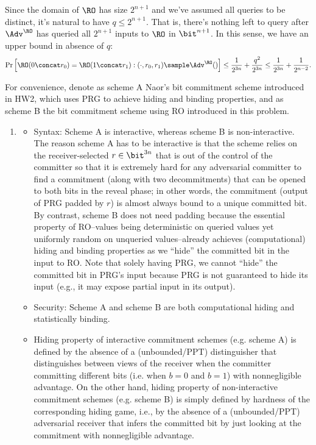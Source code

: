 \begin{answer}[ii]
    \begin{remark}
        Since the domain of $\RO$ has size $2^{n+1}$ and we've assumed all queries to be distinct, it's natural to have $q\le 2^{n+1}$. That is, there's nothing left to query after $\Adv^\RO$ has queried all $2^{n+1}$ inputs to $\RO$ in $\bit^{n+1}$.
        In this sense, we have an upper bound in absence of $q$:
        \[
            \Pr\left[\RO(0\concat r_0)=\RO(1\concat r_1) : (\cdot, r_0, r_1)\sample \Adv^\RO() \right]\le \frac{1}{2^{3n}}+ \frac{q^2}{2^{3n}}
            \le \frac{1}{2^{3n}}+ \frac{1}{2^{n-2}}.
        \]
    \end{remark}
\end{answer}






\begin{answer}[iii]
    \leavevmode\par
    For convenience, denote as scheme A Naor's bit commitment scheme introduced in HW2, which uses PRG to achieve hiding and binding properties, and as scheme B the bit commitment scheme using RO introduced in this problem. 
    \begin{enumerate}
        \item[(a)]
        \begin{itemize}
            \item Syntax: Scheme A is interactive, whereas scheme B is non-interactive. The reason scheme A has to be interactive is that the scheme relies on the receiver-selected $r\in\bit^{3n}$ that is out of the control of the committer so that it is extremely hard for any adversarial committer to find a commitment (along with two decommitments) that can be opened to both bits in the reveal phase; in other words, the commitment (output of PRG padded by $r$) is almost always bound to a unique committed bit. By contrast, scheme B does not need padding because the essential property of RO--values being deterministic on queried values yet uniformly random on unqueried values--already achieves (computational) hiding and binding properties as we ``hide'' the committed bit in the input to RO. Note that solely having PRG, we cannot ``hide'' the committed bit in PRG's input because PRG is not guaranteed to hide its input (e.g., it may expose partial input in its output).
            \item Security: Scheme A and scheme B are both computational hiding and statistically binding.
            \item Hiding property of interactive commitment schemes (e.g. scheme A) is defined by the absence of a (unbounded/PPT) distinguisher that distinguishes between views of the receiver when the committer committing different bits (i.e. when $b=0$ and $b=1$) with nonnegligible advantage.  On the other hand, hiding property of non-interactive  commitment schemes  (e.g. scheme B) is simply defined by hardness of the corresponding hiding game, i.e., by the absence of a (unbounded/PPT) adversarial receiver that infers the committed bit by just looking at the commitment with nonnegligible advantage.
        \end{itemize}


\end{enumerate}
\end{answer}

